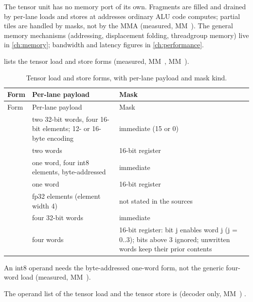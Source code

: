 The tensor unit has no memory port of its own. Fragments are filled and drained by per-lane loads and stores at
addresses ordinary ALU code computes; partial tiles are handled by masks, not by the MMA (measured, MM~). The general
memory mechanisms (addressing, displacement folding, threadgroup memory) live in \cref{ch:memory}; bandwidth and latency
figures in \cref{ch:performance}.

 lists the tensor load and store forms (measured, MM~, MM~).

\begin{xltabular}{\linewidth}{@{}XXX@{}}
\caption{Tensor load and store forms, with per-lane payload and mask kind.}\label{tab:tensor-load-store}\\
\toprule
Form & Per-lane payload & Mask \\
\midrule
\endfirsthead
{}
\toprule
Form & Per-lane payload & Mask \\
\midrule
\endhead
{} & two 32-bit words, four 16-bit elements; 12- or 16-byte encoding & immediate (15 or 0) \\*
 & two words & 16-bit register \\*
 & one word, four int8 elements, byte-addressed & immediate \\*
 & one word & 16-bit register \\*
 & fp32 elements (element width 4) & not stated in the sources \\*
 & four 32-bit words & immediate \\*
 & four words & 16-bit register: bit j enables word j (j = 0..3); bits above 3 ignored;
unwritten words keep their prior contents \\*
\bottomrule
\end{xltabular}

An int8 operand needs the byte-addressed one-word form, not the generic four-word load (measured, MM~).

The operand list of the tensor load and the tensor store is (decoder only, MM~)
.

